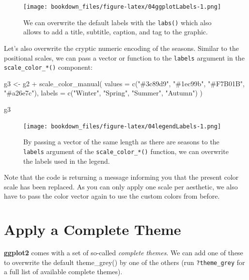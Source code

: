 \documentclass[
]{krantz}
\makeatletter
\newenvironment{Shaded}{\begin{snugshade}}{\end{snugshade}}
\newcommand{\AttributeTok}[1]{\textcolor[rgb]{0.61,0.61,0.61}{#1}}
\newcommand{\FunctionTok}[1]{\textcolor[rgb]{0,0,0}{#1}}
\newcommand{\NormalTok}[1]{#1}
\newcommand{\OtherTok}[1]{\textcolor[rgb]{0.37,0.37,0.37}{#1}}
\newcommand{\SpecialCharTok}[1]{\textcolor[rgb]{0,0,0}{#1}}
\newcommand{\StringTok}[1]{\textcolor[rgb]{0.5,0.5,0.5}{#1}}
\newenvironment{kframe}{%
\medskip{}
\setlength{\fboxsep}{.8em}
 \def\at@end@of@kframe{}%
 \ifinner\ifhmode%
  \def\at@end@of@kframe{\end{minipage}}%
  \begin{minipage}{\columnwidth}%
 \fi\fi%
 \def\FrameCommand##1{\hskip\@totalleftmargin \hskip-\fboxsep
 \colorbox{shadecolor}{##1}\hskip-\fboxsep
     \hskip-\linewidth \hskip-\@totalleftmargin \hskip\columnwidth}%
 \MakeFramed {\advance\hsize-\width
   \@totalleftmargin\z@ \linewidth\hsize
   \@setminipage}}%
 {\par\unskip\endMakeFramed%
 \at@end@of@kframe}
\renewenvironment{Shaded}{\begin{kframe}}{\end{kframe}}
\makeatother
\begin{document}
\begin{figure}
\centering
\texttt{[image: bookdown\_files/figure-latex/04ggplotLabels-1.png]}
\caption{\label{fig:04ggplotLabels}We can overwrite the default labels with the \texttt{labs()} which also allows to add a title, subtitle, caption, and tag to the graphic.}
\end{figure}

Let's also overwrite the cryptic numeric encoding of the seasons. Similar to the positional scales, we can pass a vector or function to the \texttt{labels} argument in the \texttt{scale\_color\_*()} component:

\begin{Shaded}
\begin{Highlighting}[]
\NormalTok{g3 }\OtherTok{\textless{}{-}}\NormalTok{ g2 }\SpecialCharTok{+}
  \FunctionTok{scale\_color\_manual}\NormalTok{(}
    \AttributeTok{values =} \FunctionTok{c}\NormalTok{(}\StringTok{"\#3c89d9"}\NormalTok{, }\StringTok{"\#1ec99b"}\NormalTok{, }\StringTok{"\#F7B01B"}\NormalTok{, }\StringTok{"\#a26e7c"}\NormalTok{),}
    \AttributeTok{labels =} \FunctionTok{c}\NormalTok{(}\StringTok{"Winter"}\NormalTok{, }\StringTok{"Spring"}\NormalTok{, }\StringTok{"Summer"}\NormalTok{, }\StringTok{"Autumn"}\NormalTok{)}
\NormalTok{  )}

\NormalTok{g3}
\end{Highlighting}
\end{Shaded}

\begin{figure}
\centering
\texttt{[image: bookdown\_files/figure-latex/04legendLabels-1.png]}
\caption{\label{fig:04legendLabels}By passing a vector of the same length as there are seasons to the \texttt{labels} argument of the \texttt{scale\_color\_*()} function, we can overwrite the labels used in the legend.}
\end{figure}

Note that the code is returning a message informing you that the present color scale has been replaced. As you can only apply one scale per aesthetic, we also have to pass the color vector again to use the custom colors from before.

\hypertarget{complete-themes}{%
\section{Apply a Complete Theme}\label{complete-themes}}

\textbf{ggplot2} comes with a set of so-called \emph{complete themes}. We can add one of these to overwrite the default theme\_grey() by one of the others (run \texttt{?theme\_grey} for a full list of available complete themes).
\end{document}
